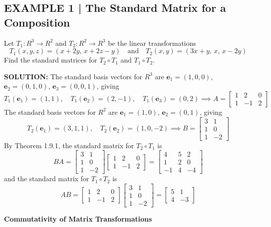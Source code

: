\documentclass{article}
\newcommand{\redheading}[1]{{\vspace{2mm}\noindent\Large\bfseries\color{red!55!black} #1\par}\vspace{2mm}}
\theoremstyle{mystyle}
\begin{document}
\subsection*{EXAMPLE 1 | The Standard Matrix for a Composition}
Let $T_1:R^3\to R^2$ and $T_2:R^2\to R^3$ be the linear transformations
\[
T_1(x,y,z)=(x+2y,\,x+2z-y)\quad\text{and}\quad T_2(x,y)=(3x+y,\,x,\,x-2y)
\]
Find the standard matrices for $T_2\circ T_1$ and $T_1\circ T_2$.

\textbf{SOLUTION:} The standard basis vectors for $R^3$ are $\mathbf{e}_1=(1,0,0)$, $\mathbf{e}_2=(0,1,0)$, $\mathbf{e}_3=(0,0,1)$, giving
\[
T_1(\mathbf{e}_1)=(1,1),\quad T_1(\mathbf{e}_2)=(2,-1),\quad T_1(\mathbf{e}_3)=(0,2)
\implies A=\begin{bmatrix}1&2&0\\1&-1&2\end{bmatrix}
\]
The standard basis vectors for $R^2$ are $\mathbf{e}_1=(1,0)$, $\mathbf{e}_2=(0,1)$, giving
\[
T_2(\mathbf{e}_1)=(3,1,1),\quad T_2(\mathbf{e}_2)=(1,0,-2)
\implies B=\begin{bmatrix}3&1\\1&0\\1&-2\end{bmatrix}
\]
By Theorem 1.9.1, the standard matrix for $T_2\circ T_1$ is
\[
BA=\begin{bmatrix}3&1\\1&0\\1&-2\end{bmatrix}\begin{bmatrix}1&2&0\\1&-1&2\end{bmatrix}=\begin{bmatrix}4&5&2\\1&2&0\\-1&4&-4\end{bmatrix}
\]
and the standard matrix for $T_1\circ T_2$ is
\[
AB=\begin{bmatrix}1&2&0\\1&-1&2\end{bmatrix}\begin{bmatrix}3&1\\1&0\\1&-2\end{bmatrix}=\begin{bmatrix}5&1\\4&-3\end{bmatrix}
\]

\redheading{Commutativity of Matrix Transformations}
\end{document}
